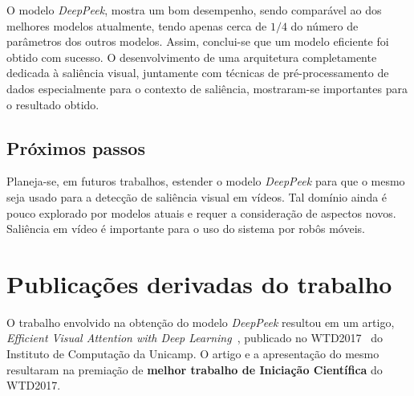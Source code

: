 \documentclass[11pt]{article}
\newcommand{\tit}[1]{\textit{#1}}
\newcommand{\tbf}[1]{\textbf{#1}}
\begin{document}
O modelo \tit{DeepPeek}, mostra um bom desempenho, sendo comparável
ao dos melhores modelos atualmente, tendo apenas cerca de $1/4$ do número
de parâmetros dos outros modelos.
Assim, conclui-se que um modelo eficiente foi obtido com sucesso.
O desenvolvimento de uma arquitetura completamente dedicada à saliência visual,
juntamente com técnicas de pré-processamento de dados especialmente para
o contexto de saliência, mostraram-se importantes para o resultado obtido.

\subsection{Próximos passos}
Planeja-se, em futuros trabalhos, estender o modelo \tit{DeepPeek} para
que o mesmo seja usado para a detecção de saliência visual em vídeos.
Tal domínio ainda é pouco explorado por modelos atuais e requer a consideração
de aspectos novos.
Saliência em vídeo é importante para o uso do sistema por robôs móveis.

\section{Publicações derivadas do trabalho}
O trabalho envolvido na obtenção do modelo \tit{DeepPeek} resultou em um
artigo, \tit{Efficient Visual Attention with Deep Learning}~\cite{myarticle},
publicado no WTD2017~\cite{wtd2017} do Instituto de Computação da Unicamp.
O artigo e a apresentação do mesmo resultaram na premiação de
\tbf{melhor trabalho de Iniciação Científica} do WTD2017.

\printbibliography

\end{document}
